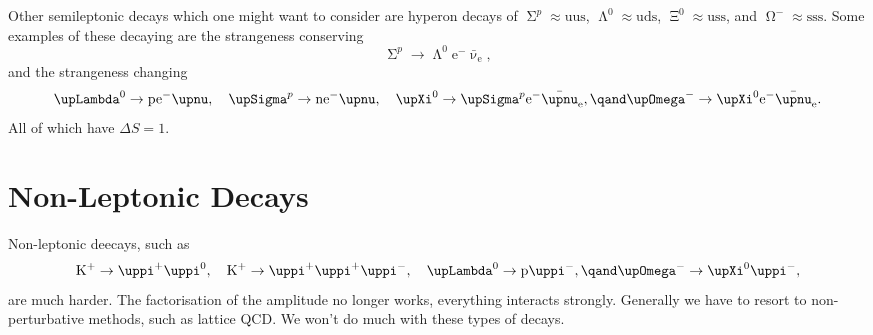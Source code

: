 \documentclass[fleqn]{NotesClass}
\newcommand{\Pparticle}[1]{\mathrm{#1}}
\newcommand{\Pu}{\ensuremath{\Pparticle{u}}}
\newcommand{\Pd}{\ensuremath{\Pparticle{d}}}
\newcommand{\Ps}{\ensuremath{\Pparticle{s}}}
\newcommand{\Pe}{\ensuremath{\Pparticle{e}^{-}}}
\newcommand{\Ppip}{\ensuremath{\uppi^{+}}}
\newcommand{\Ppim}{\ensuremath{\uppi^{-}}}
\newcommand{\Ppizero}{\ensuremath{\uppi^{0}}}
\newcommand{\PKp}{\ensuremath{\Pparticle{K}^+}}
\newcommand{\Pp}{\ensuremath{\Pparticle{p}}}
\newcommand{\Pn}{\ensuremath{\Pparticle{n}}}
\newcommand{\PSigmap}{\ensuremath{\upSigma^{p}}}
\newcommand{\PLambdazero}{\ensuremath{\upLambda^{0}}}
\newcommand{\PXizero}{\ensuremath{\upXi^{0}}}
\newcommand{\POmegam}{\ensuremath{\upOmega^{-}}}
\newcommand{\APantiparticle}[1]{\bar{#1}}
\newcommand{\APnu}{\ensuremath{\upnu}}
\newcommand{\APnue}{\ensuremath{\APantiparticle{\upnu}_{\mathrm{e}}}}
\begin{document}
    Other semileptonic decays which one might want to consider are hyperon decays of \(\PSigmap \approx \Pu\Pu\Ps\), \(\PLambdazero \approx \Pu\Pd\Ps\), \(\PXizero \approx \Pu\Ps\Ps\), and \(\POmegam \approx \Ps\Ps\Ps\).
    Some examples of these decaying are the strangeness conserving
    \begin{equation}
        \PSigmap \to \PLambdazero \Pe\APnue,
    \end{equation}
    and the strangeness changing
    \begin{equation}
        \PLambdazero \to \Pp\Pe\APnu, \quad \PSigmap \to \Pn\Pe\APnu, \quad \PXizero \to \PSigmap\Pe\APnue, \qand \POmegam \to \PXizero\Pe\APnue.
    \end{equation}
    All of which have \(\Delta S = 1\).
    
    \section{Non-Leptonic Decays}
    Non-leptonic deecays, such as
    \begin{equation}
        \PKp \to \Ppip\Ppizero, \quad \PKp \to \Ppip\Ppip\Ppim, \quad \PLambdazero \to \Pp\Ppim, \qand \POmegam \to \PXizero\Ppim,
    \end{equation}
    are much harder.
    The factorisation of the amplitude no longer works, everything interacts strongly.
    Generally we have to resort to non-perturbative methods, such as lattice QCD.
    We won't do much with these types of decays.
    
    
    
%        
    
    \backmatter
    \printindex
\end{document}
